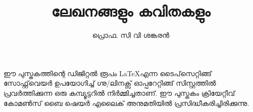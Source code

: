 \documentclass[12pt,a4paper]{book}
\title{\fontsize{40pt}{1em}\selectfont \color{white}ലേഖനങ്ങളും കവിതകളും}
\author{\fontsize{20pt}{1em}\selectfont \color{white} പ്രൊഫ. സി വി ശങ്കരൻ}
\date{}
\newcommand*\cleartoleftpage{%
  \clearpage
  \ifodd\value{page}\hbox{}\newpage\fi
}
\begin{document}
\pagecolor{Maroon}
\maketitle
{}
\pagecolor{white}
\newpage
\vspace*{\fill}
\noindent
\parbox{10cm}{
ഈ പുസ്തകത്തിന്റെ ഡിജിറ്റൽ രൂപം \LaTeX എന്ന ടൈപ്‌സെറ്റിങ്ങ് സോഫ്റ്റ്‌വെയർ ഉപയോഗിച്ച് ഗ്നു/ലിനക്സ് ഓപ്പറേറ്റിങ്ങ് സിസ്റ്റത്തിൽ പ്രവർത്തിക്കുന്ന ഒരു കമ്പ്യൂട്ടറിൽ നിർമ്മിച്ചതാണ്. ഈ പുസ്തകം ക്രിയേറ്റീവ് കോമൺസ് ബൈ ഷെയർ എലൈക് അനുമതിയിൽ പ്രസിദ്ധീകരിച്ചിരിക്കുന്നു.}
\cleartoleftpage
\tableofcontents
\newpage\null\thispagestyle{empty} %
\setcounter{page}{1} %
\cleartoleftpage
\lfoot{}
\rfoot{}
\cfoot{\thepage} %
\lhead{}
\chead{}
\pagestyle{fancy}
\renewcommand{\headrulewidth}{0pt}



























\newpage
\pagecolor{Maroon}
\newpage\null\thispagestyle{empty}\newpage %
\end{document}
